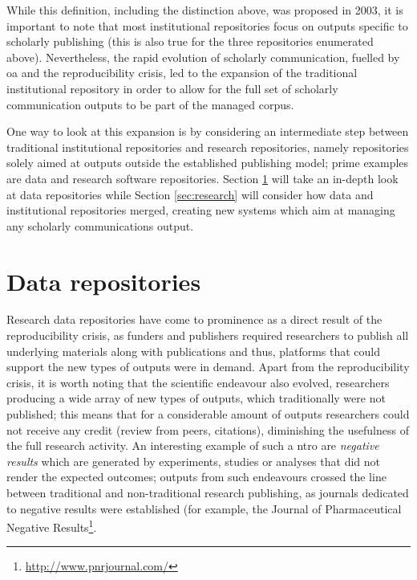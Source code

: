 While this definition, including the distinction above, was proposed in 2003, it is important to note that most institutional repositories focus on outputs specific to scholarly publishing (this is also true for the three repositories enumerated above). Nevertheless, the rapid evolution of scholarly communication, fuelled by \gls{oa} and the reproducibility crisis, led to the expansion of the traditional institutional repository in order to allow for the full set of scholarly communication outputs to be part of the managed corpus.

One way to look at this expansion is by considering an intermediate step between traditional institutional repositories and research repositories, namely repositories solely aimed at outputs outside the established publishing model; prime examples are data and research software repositories. Section \ref{sec:data} will take an in-depth look at data repositories while Section \ref{sec:research} will consider how data and institutional repositories merged, creating new systems which aim at managing any scholarly communications output.

\newpage

\section{Data repositories}
\label{sec:data}

Research data repositories have come to prominence as a direct result of the reproducibility crisis, as funders and publishers required researchers to publish all underlying materials along with publications and thus, platforms that could support the new types of outputs were in demand. Apart from the reproducibility crisis, it is worth noting that the scientific endeavour also evolved, researchers producing a wide array of new types of outputs, which traditionally were not published; this means that for a considerable amount of outputs researchers could not receive any credit (review from peers, citations), diminishing the usefulness of the full research activity. An interesting example of such a \gls{ntro} are \emph{negative results} which are generated by experiments, studies or analyses that did not render the expected outcomes; outputs from such endeavours crossed the line between traditional and non-traditional research publishing, as journals dedicated to negative results were established (for example, the Journal of Pharmaceutical Negative Results\footnote{\url{http://www.pnrjournal.com/}}.

